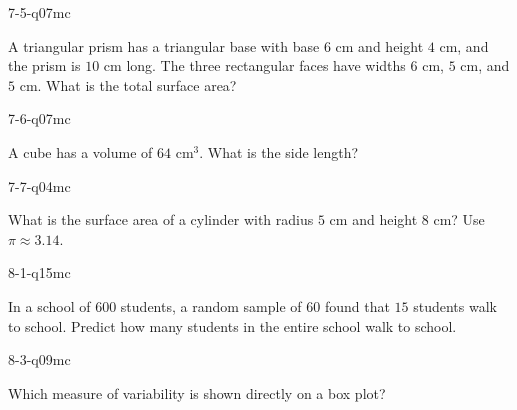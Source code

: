 \begin{practiceQuestion}{7-5-q07}{mc}
\begin{questionText}
A triangular prism has a triangular base with base $6$ cm and height $4$ cm, and the prism is $10$ cm long. The three rectangular faces have widths $6$ cm, $5$ cm, and $5$ cm. What is the total surface area?
\end{questionText}
\end{practiceQuestion}

\begin{practiceQuestion}{7-6-q07}{mc}
\begin{questionText}
A cube has a volume of $64$ cm$^3$. What is the side length?
\end{questionText}
\end{practiceQuestion}

\begin{practiceQuestion}{7-7-q04}{mc}
\begin{questionText}
What is the surface area of a cylinder with radius $5$ cm and height $8$ cm? Use $\pi \approx 3.14$.
\end{questionText}
\end{practiceQuestion}

\begin{practiceQuestion}{8-1-q15}{mc}
\begin{questionText}
In a school of $600$ students, a random sample of $60$ found that $15$ students walk to school. Predict how many students in the entire school walk to school.
\end{questionText}
\end{practiceQuestion}

\begin{practiceQuestion}{8-3-q09}{mc}
\begin{questionText}
Which measure of variability is shown directly on a box plot?
\end{questionText}
\end{practiceQuestion}

